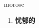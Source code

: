 
\begin{frame}
{\huge morose}
\begin{center}
\begin{enumerate}\Large
  \item \textbf{忧郁的}
\end{enumerate}
\end{center}
\end{frame}
